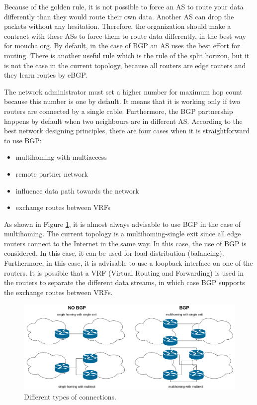 \documentclass{article}
\begin{document}
Because of the golden rule, it is not possible to force an AS to route your data differently than they would route their own data. Another AS can drop the packets without any hesitation. Therefore, the organization should make a contract with these ASs to force them to route data differently, in the best way for moucha.org. By default, in the case of BGP an AS uses the best effort for routing. There is another useful rule which is the rule of the split horizon, but it is not the case in the current topology, because all routers are edge routers and they learn routes by eBGP.

The network administrator must set a higher number for maximum hop count because this number is one by default. It means that it is working only if two routers are connected by a single cable. Furthermore, the BGP partnership happens by default when two neighbours are in different AS. According to the best network designing principles, there are four cases when it is straightforward to use BGP:
\begin{itemize}
    \item multihoming with multiaccess
    \item remote partner network
    \item influence data path towards the network
    \item exchange routes between VRFs
\end{itemize}

As shown in Figure \ref{fig:bpgs}, it is almost always advisable to use BGP in the case of multihoming. The current topology is a multihoming-single exit since all edge routers connect to the Internet in the same way. In this case, the use of BGP is considered. In this case, it can be used for load distribution (balancing). Furthermore, in this case, it is advisable to use a loopback interface on one of the routers. It is possible that a VRF (Virtual Routing and Forwarding) is used in the routers to separate the different data streams, in which case BGP supports the exchange routes between VRFs.

\begin{figure}
\centering
\includegraphics[width=1\textwidth]{bgps.png}
\caption{\label{fig:bpgs}Different types of connections.}
\end{figure}
\end{document}
